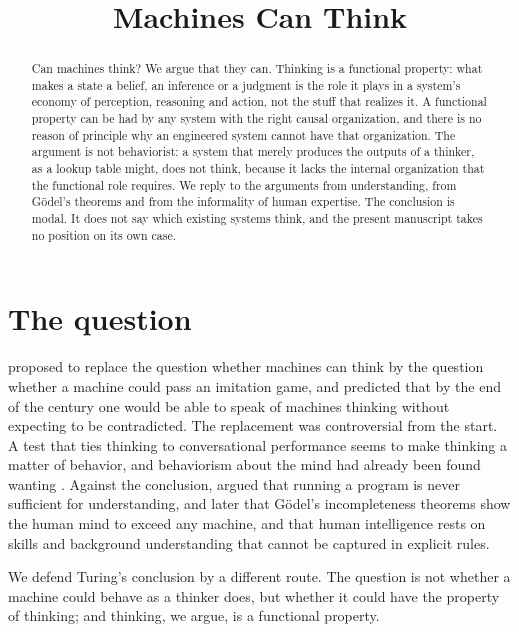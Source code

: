 \documentclass{situationist-preprint}
\title{Machines Can Think}
\begin{document}
\maketitle

\begin{abstract}
Can machines think? We argue that they can. Thinking is a functional property: what makes a state a belief, an inference or a judgment is the role it plays in a system's economy of perception, reasoning and action, not the stuff that realizes it. A functional property can be had by any system with the right causal organization, and there is no reason of principle why an engineered system cannot have that organization. The argument is not behaviorist: a system that merely produces the outputs of a thinker, as a lookup table might, does not think, because it lacks the internal organization that the functional role requires. We reply to the arguments from understanding, from G\"odel's theorems and from the informality of human expertise. The conclusion is modal. It does not say which existing systems think, and the present manuscript takes no position on its own case.
\end{abstract}

\section{The question}

\citet{Turing1950} proposed to replace the question whether machines can think by the question whether a machine could pass an imitation game, and predicted that by the end of the century one would be able to speak of machines thinking without expecting to be contradicted. The replacement was controversial from the start. A test that ties thinking to conversational performance seems to make thinking a matter of behavior, and behaviorism about the mind had already been found wanting \citep{Block1981}. Against the conclusion, \citet{Searle1980} argued that running a program is never sufficient for understanding, \citet{Lucas1961} and later \citet{Penrose1989} that G\"odel's incompleteness theorems show the human mind to exceed any machine, and \citet{Dreyfus1972} that human intelligence rests on skills and background understanding that cannot be captured in explicit rules.

We defend Turing's conclusion by a different route. The question is not whether a machine could behave as a thinker does, but whether it could have the property of thinking; and thinking, we argue, is a functional property.
\end{document}
